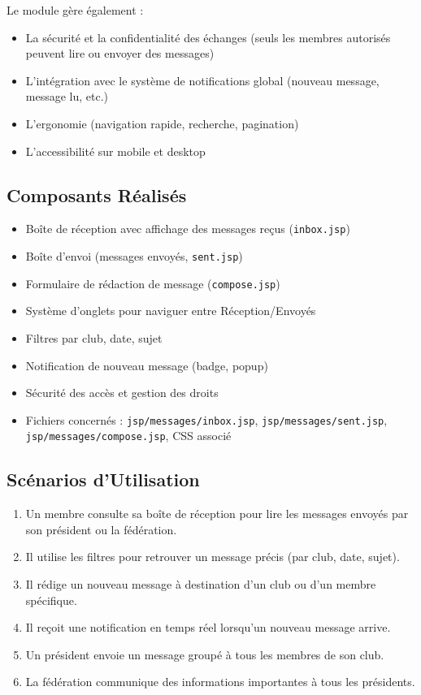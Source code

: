 \documentclass[12pt,a4paper]{article}
\begin{document}
Le module gère également :
\begin{itemize}
    \item La sécurité et la confidentialité des échanges (seuls les membres autorisés peuvent lire ou envoyer des messages)
    \item L'intégration avec le système de notifications global (nouveau message, message lu, etc.)
    \item L'ergonomie (navigation rapide, recherche, pagination)
    \item L'accessibilité sur mobile et desktop
\end{itemize}

\subsection{Composants Réalisés}
\begin{itemize}
    \item Boîte de réception avec affichage des messages reçus (\texttt{inbox.jsp})
    \item Boîte d'envoi (messages envoyés, \texttt{sent.jsp})
    \item Formulaire de rédaction de message (\texttt{compose.jsp})
    \item Système d'onglets pour naviguer entre Réception/Envoyés
    \item Filtres par club, date, sujet
    \item Notification de nouveau message (badge, popup)
    \item Sécurité des accès et gestion des droits
    \item Fichiers concernés : \texttt{jsp/messages/inbox.jsp}, \texttt{jsp/messages/sent.jsp}, \texttt{jsp/messages/compose.jsp}, CSS associé
\end{itemize}

\subsection{Scénarios d'Utilisation}
\begin{enumerate}
    \item Un membre consulte sa boîte de réception pour lire les messages envoyés par son président ou la fédération.
    \item Il utilise les filtres pour retrouver un message précis (par club, date, sujet).
    \item Il rédige un nouveau message à destination d'un club ou d'un membre spécifique.
    \item Il reçoit une notification en temps réel lorsqu'un nouveau message arrive.
    \item Un président envoie un message groupé à tous les membres de son club.
    \item La fédération communique des informations importantes à tous les présidents.
\end{enumerate}
\end{document}
